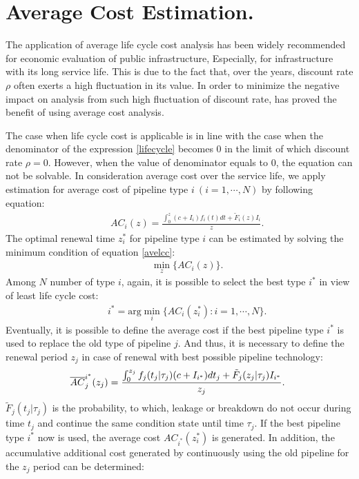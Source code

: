 \section{Average Cost Estimation.}
The application of average life cycle cost analysis has been widely recommended for economic evaluation of public infrastructure, Especially, for infrastructure with its long service life. This is due to the fact that, over the years, discount rate $\rho$ often exerts a high fluctuation in its value. In order to minimize the negative impact on analysis from such high fluctuation of discount rate, \cite{kobaevarg} has proved the benefit of using average cost analysis.

The case when life cycle cost is applicable is in line with the case when the denominator of the expression \ref{lifecycle} becomes $0$ in the limit of which discount rate $\rho=0$. However, when the value of denominator equals to $0$, the equation can not be solvable. In consideration average cost over the service life, we apply estimation for average cost of pipeline type $i~(i=1,\cdots,N)$ by following equation:
\begin{eqnarray}
&& AC_i(z)=\frac{\int_0^{z} (c+I_i) f_i(t) dt  +  \tilde{F}_i(z)I_i}{z} .\label{avelcc}
\end{eqnarray}
The optimal renewal time $z_i^\ast$ for pipeline type $i$ can be estimated by solving the minimum condition of equation \ref{avelcc}:
\begin{eqnarray}
&& \min_{z}\{ AC_i(z) \}.\label{iimp}
\end{eqnarray}
Among $N$ number of type $i$, again, it is possible to select the best type $i^\ast$ in view of least life cycle cost:
\begin{eqnarray}
&& i^\ast=\mbox{arg} \min_{i}\{ AC_i(z_i^\ast):i=1,\cdots,N\}.
\end{eqnarray}
Eventually, it is possible to define the average cost if the best pipeline type $i^\ast$ is used to replace the old type of pipeline $j$. And thus, it is necessary to define the renewal period $z_j$ in case of renewal with best possible pipeline technology:
\begin{eqnarray}
&& \hspace{-5mm} \overline{AC}_j^{i^\ast}(z_j)
  =\frac{\int_0^{z_j} f_j(t_j|\tau_j)(c+I_{i^\ast}) dt_j  + \tilde{F}_j(z_j|\tau_j)I_{i^\ast} }{z_j} .\label{han11}
\end{eqnarray}
$\tilde{F}_j(t_j|\tau_j)$ is the probability, to which, leakage or breakdown do not occur during time $t_j$ and continue the same condition state until time $\tau_j$. If the best pipeline type $i^\ast$ now is used, the average cost $AC_{i^\ast}(z_i^\ast)$ is generated. In addition, the accumulative additional cost generated by continuously using the old pipeline for the $z_j$ period can be determined:
